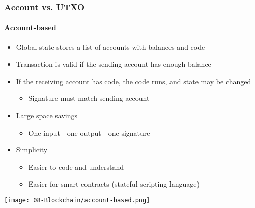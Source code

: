 \subsubsection{Account vs. UTXO}
\paragraph{Account-based}
\begin{itemize}
    \item Global state stores a list of accounts with balances and code
    \item Transaction is valid if the sending account has enough balance
    \item If the receiving account has code, the code runs, and state may be changed
    \begin{itemize}
        \item Signature must match sending account
    \end{itemize}
    \item Large space savings
    \begin{itemize}
        \item One input - one output - one signature
    \end{itemize}
    \item Simplicity
    \begin{itemize}
        \item Easier to code and understand
        \item Easier for smart contracts (stateful scripting language)
    \end{itemize}
\end{itemize}
\begin{center}
    \texttt{[image: 08-Blockchain/account-based.png]}    
\end{center}
